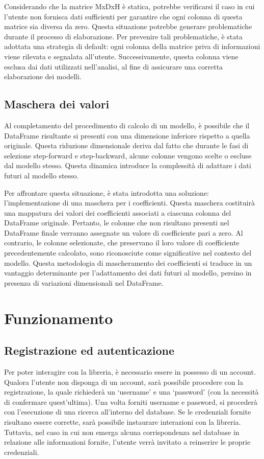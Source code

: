\documentclass{rapportECL}
\begin{document}
Considerando che la matrice MxDxH è statica, potrebbe verificarsi il caso in cui l'utente non fornisca dati sufficienti per garantire che ogni 
colonna di questa matrice sia diversa da zero. Questa situazione potrebbe generare problematiche durante il processo di elaborazione. 
Per prevenire tali problematiche, è stata adottata una strategia di default: ogni colonna della matrice priva di informazioni viene rilevata e segnalata 
all'utente. Successivamente, questa colonna viene esclusa dai dati utilizzati nell'analisi, al fine di assicurare una corretta elaborazione dei modelli.

\section{Maschera dei valori}

Al completamento del procedimento di calcolo di un modello, è possibile che il DataFrame risultante si presenti con una dimensione inferiore rispetto
a quella originale. Questa riduzione dimensionale deriva dal fatto che durante le fasi di selezione step-forward e step-backward, alcune colonne vengono 
scelte o escluse dal modello stesso. Questa dinamica introduce la complessità di adattare i dati futuri al modello stesso.

Per affrontare questa situazione, è stata introdotta una soluzione: l'implementazione di una maschera per i coefficienti. 
Questa maschera costituirà una mappatura dei valori dei coefficienti associati a ciascuna colonna del DataFrame originale. 
Pertanto, le colonne che non risultano presenti nel DataFrame finale verranno assegnate un valore di coefficiente pari a zero. Al contrario, le colonne 
selezionate, che preservano il loro valore di coefficiente precedentemente calcolato, sono riconosciute come significative nel contesto del modello. 
Questa metodologia di mascheramento dei coefficienti si traduce in un vantaggio determinante per l'adattamento dei dati futuri al modello, 
persino in presenza di variazioni dimensionali nel DataFrame.

\chapter{Funzionamento}

\section{Registrazione ed autenticazione}
Per poter interagire con la libreria, è necessario essere in possesso di un account. Qualora l'utente non disponga di un account, 
sarà possibile procedere con la registrazione, la quale richiederà un `username' e una `password' (con la necessità di confermare quest'ultima). 
Una volta forniti username e password, si procederà con l'esecuzione di una ricerca all'interno del database.
Se le credenziali fornite risultano essere corrette, sarà possibile instaurare interazioni con la libreria. 
Tuttavia, nel caso in cui non emerga alcuna corrispondenza nel database in relazione alle informazioni fornite, 
l'utente verrà invitato a reinserire le proprie credenziali. 
\end{document}
